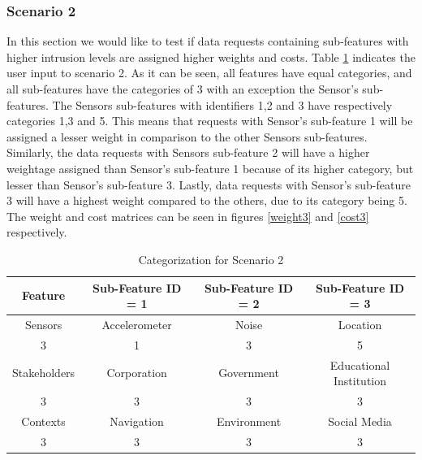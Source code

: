 \subsubsection{Scenario 2}
In this section we would like to test if data requests containing sub-features with higher intrusion levels are assigned higher weights and costs.
Table \ref{tab:scenario3} indicates the user input to scenario 2. As it can be seen, all features have equal categories, and
all sub-features have the categories of 3 with an exception the  Sensor's sub-features. The Sensors sub-features with identifiers 1,2 and 3 have respectively categories 1,3 and 5. This means that requests with Sensor's sub-feature 1 will be assigned a lesser weight in comparison to the other Sensors sub-features. Similarly, the data requests
with Sensors sub-feature 2 will have a higher weightage assigned than Sensor's sub-feature 1 because of its higher category, but lesser than Sensor's sub-feature 3. Lastly, data requests with Sensor's sub-feature 3 will have a highest weight compared to the others, due to its category being 5. The weight and cost matrices can be seen in figures \ref{weight3} and \ref{cost3} respectively.

\begin{table}[h!]
  \centering
  \caption{Categorization for Scenario 2}
  \label{tab:scenario3}
  \begin{tabular}{cccc}
    \toprule
    Feature & Sub-Feature ID = 1 & Sub-Feature ID = 2 & Sub-Feature ID = 3\\
    \midrule
    Sensors & Accelerometer & Noise & Location\\
     3 & 1 & 3 & 5\\ \hhline{====}
     Stakeholders & Corporation & Government & Educational Institution\\
     3 & 3 & 3 & 3\\ \hhline{====}
     Contexts & Navigation & Environment & Social Media\\
     3 & 3 & 3 & 3\\ 
    \bottomrule
  \end{tabular}
\end{table}

